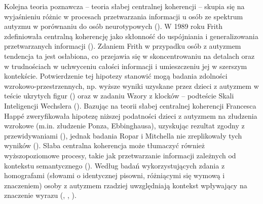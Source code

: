     Kolejna teoria poznawcza -- teoria słabej centralnej koherencji -- skupia się na wyjaśnieniu różnic w procesach przetwarzania informacji u osób ze spektrum autyzmu w porównaniu do osób neurotypowych (\cite{happe2006weak}).
    W 1989 roku Frith zdefiniowała centralną koherencję jako skłonność do uspójniania i generalizowania przetwarzanych informacji (\cite{frith2008autyzm}). 
    Zdaniem Frith w przypadku osób z autyzmem tendencja ta jest osłabiona, co przejawia się w skoncentrowaniu na detalach oraz w trudnościach w uchwyceniu całości informacji i umieszczeniu jej w szerszym kontekście.
    Potwierdzenie tej hipotezy stanowić mogą badania zdolności wzrokowo-przestrzennych, np. wyższe wyniki uzyskane przez dzieci z autyzmem w teście ukrytych figur (\cite{shah1983islet}) oraz w zadaniu Wzory z klocków -- podteście Skali Inteligencji Wechslera (\cite{shah1993autistic}).
    Bazując na teorii słabej centralnej koherencji Francesca Happ{\'e} zweryfikowała hipotezę niższej podatności dzieci z autyzmem na złudzenia wzrokowe (m.in. złudzenie Ponza, Ebbinghausa), uzyskując rezultat zgodny z przewidywaniami (\cite{happe1996studying}), jednak badania Ropar i Mitchella nie zreplikowały tych wyników (\cite{ropar1999individuals}).
    Słaba centralna koherencja może tłumaczyć również wyższopoziomowe procesy, takie jak przetwarzanie informacji zależnych od kontekstu semantycznego (\cite{frith2008autyzm}).
    Według badań wykorzystujących zdania z homografami (słowami o identycznej pisowni, różniącymi się wymową i znaczeniem) osoby z autyzmem rzadziej uwzględniają kontekst wpływający na znaczenie wyrazu (\cite{frith1983reading}, \cite{happe1997central}, \cite{jolliffe1999test}).  
    
